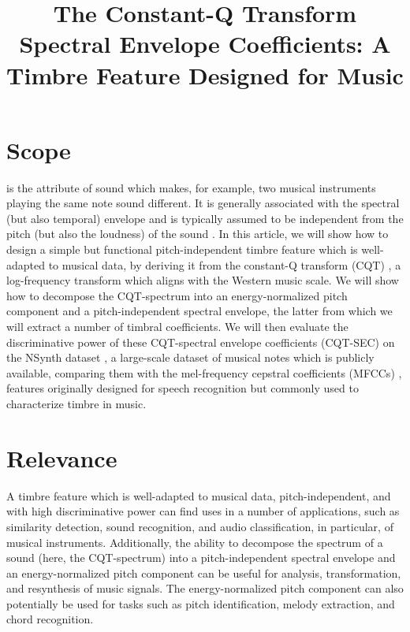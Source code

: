 \documentclass[journal]{IEEEtran}
\begin{document}
\title{The Constant-Q Transform Spectral Envelope Coefficients: A Timbre Feature Designed for Music}

\maketitle

\section{Scope}

 is the attribute of sound which makes, for example, two musical instruments playing the same note sound different. It is generally associated with the spectral (but also temporal) envelope and is typically assumed to be independent from the pitch (but also the loudness) of the sound \cite{moore2004}. In this article, we will show how to design a simple but functional pitch-independent timbre feature which is well-adapted to musical data, by deriving it from the constant-Q transform (CQT) \cite{brown1991, brown1992}, a log-frequency transform which aligns with the Western music scale. We will show how to decompose the CQT-spectrum into an energy-normalized pitch component and a pitch-independent spectral envelope, the latter from which we will extract a number of timbral coefficients. We will then evaluate the discriminative power of these CQT-spectral envelope coefficients (CQT-SEC) on the NSynth dataset \cite{engel2017}, a large-scale dataset of musical notes which is publicly available, comparing them with the mel-frequency cepstral coefficients (MFCCs) \cite{mermelstein1976}, features originally designed for speech recognition but commonly used to characterize timbre in music. 


\section{Relevance}

A timbre feature which is well-adapted to musical data, pitch-independent, and with high discriminative power can find uses in a number of applications, such as similarity detection, sound recognition, and audio classification, in particular, of musical instruments. Additionally, the ability to decompose the spectrum of a sound (here, the CQT-spectrum) into a pitch-independent spectral envelope and an energy-normalized pitch component can be useful for analysis, transformation, and resynthesis of music signals. The energy-normalized pitch component can also potentially be used for tasks such as pitch identification, melody extraction, and chord recognition.
\end{document}
